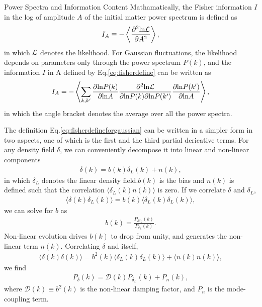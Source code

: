 \begin{section}{Power Spectra and Information Content}
   Mathamatically, the Fisher information \cite{bib:Tegmark1997} $I$ in the log of amplitude $A$ of the initial 
matter power spectrum is defined as 
\begin{align}
   I_A \equiv -\left\langle \frac{\partial ^2 \mathrm{ln \mathcal{L}}}{\partial A ^2}\right\rangle,
\label{eq:fisherdefine}
\end{align}
   in which $\mathcal{L}$ denotes the likelihood. For Gaussian fluctuations, the likelihood depends on
parameters only through the power spectrum $P(k)$, and the information $I$ in A defined by Eq.\ref{eq:fisherdefine}
can be written as \cite{bib:Rimes2006}
\begin{align}
    I_A = - \left\langle \sum_{k,k'} \frac{\partial \mathrm{ln} P(k)}{\partial \mathrm{ln} A} 
\frac{\partial ^2 \mathrm{ln \mathcal{L}}}{\partial \mathrm{ln} P(k) \partial \mathrm{ln} P(k')}
\frac{\partial \mathrm{ln} P(k')}{\partial \mathrm{ln} A}\right\rangle,
\label{eq:fisherdefineforgaussian}
\end{align}
in which the angle bracket denotes the average over all the power spectra.

  The definition Eq.\ref{eq:fisherdefineforgaussian} can be written in a simpler form in two aspects, one 
of which is the first and the third partial dericative terms. 
For any density field $\delta$, we can conveniently decompose it into linear and non-linear components
\begin{align}
    \delta (k) = b (k) \delta _L (k) + n (k),
\label{eq:decompose}
\end{align}
in which $\delta_L$ denotes the linear density field.$b (k)$ is the bias and $n (k)$ is defined  
such that the correlation $\langle \delta_L (k) n (k) \rangle$ is zero. If we correlate  
$\delta$ and $\delta_L$,
\begin{align}
   \langle \delta (k) \delta_L (k) \rangle = b (k) \langle \delta_L (k) \delta_L (k) \rangle,
\label{eq:correlating}
\end{align} 
    we can solve for $b$ as 
\begin{align}
    b (k) = \frac{P _{\delta \delta_L}(k)}{P_{\delta_L}(k)}.
\label{eq:bofk}
\end{align}
Non-linear evolution drives $b (k)$ to drop from unity, and generates the non-linear term $n (k)$. 
Correlating $\delta$ and itself, 
\begin{align}
  \langle \delta (k) \delta (k) \rangle = b^2 (k) \langle \delta_L (k) \delta_L (k) \rangle + \langle n(k)n(k) \rangle,
\end{align}
we find 
\begin{align}
   P_\delta (k) = \mathcal{D} (k) P_{\delta_L} (k) + P_n (k),
\label{eq:powerdecompose}
\end{align}
where $\mathcal{D}(k) \equiv b^2 (k)$ is the non-linear damping factor, and $P_n$ is the mode-coupling term.


\end{section}
